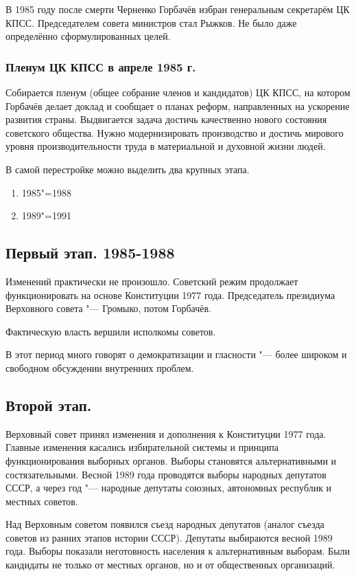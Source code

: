     В 1985 году после смерти Черненко Горбачёв избран генеральным секретарём ЦК КПСС. Председателем совета министров стал Рыжков. Не было даже определённо сформулированных целей.

    \subsubsection{Пленум ЦК КПСС в апреле 1985 г.}
    Собирается пленум (общее собрание членов и кандидатов) ЦК КПСС, на котором Горбачёв делает доклад и сообщает о планах реформ, направленных на ускорение развития страны. Выдвигается задача достичь качественно нового состояния советского общества. Нужно модернизировать производство и достичь мирового уровня производительности труда в материальной и духовной жизни людей.
    
    В самой перестройке можно выделить два крупных этапа.
    
    \begin{enumerate}
        \item 1985"=1988
        \item 1989"=1991
    \end{enumerate}

    \subsection{Первый этап. 1985-1988}
    Изменений практически не произошло. Советский режим продолжает функционировать на основе Конституции 1977 года. Председатель президиума Верховного совета "--- Громыко, потом Горбачёв.
    
    Фактическую власть вершили исполкомы советов.
    
    В этот период много говорят о демократизации и гласности "--- более широком и свободном обсуждении внутренних проблем.
    
\subsection{Второй этап.}
    Верховный совет принял изменения и дополнения к Конституции 1977 года. Главные изменения касались избирательной системы и принципа функционирования выборных органов. Выборы становятся альтернативными и состязательными. Весной 1989 года проводятся выборы народных депутатов СССР, а через год "--- народные депутаты союзных, автономных республик и местных советов.
    
    Над Верховным советом появился съезд народных депутатов (аналог съезда советов из ранних этапов истории СССР). Депутаты выбираются весной 1989 года. Выборы показали неготовность населения к альтернативным выборам. Были кандидаты не только от местных органов, но и от общественных организаций.
    
